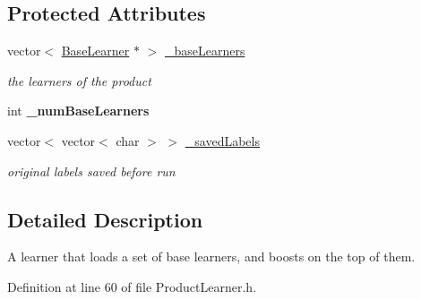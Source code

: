 \subsection*{Protected Attributes}
\begin{DoxyCompactItemize}
\item 
\hypertarget{classMultiBoost_1_1ProductLearner_a8e082a80e0c4a0c374ef6ace729aef57}{
vector$<$ \hyperlink{classMultiBoost_1_1BaseLearner}{BaseLearner} $\ast$ $>$ \hyperlink{classMultiBoost_1_1ProductLearner_a8e082a80e0c4a0c374ef6ace729aef57}{\_\-baseLearners}}
\label{classMultiBoost_1_1ProductLearner_a8e082a80e0c4a0c374ef6ace729aef57}

\begin{DoxyCompactList}\small\item\em the learners of the product \end{DoxyCompactList}\item 
\hypertarget{classMultiBoost_1_1ProductLearner_a96ab7bccfd4581e1928a630255e10124}{
int {\bfseries \_\-numBaseLearners}}
\label{classMultiBoost_1_1ProductLearner_a96ab7bccfd4581e1928a630255e10124}

\item 
\hypertarget{classMultiBoost_1_1ProductLearner_a27a48e44904e8aac9e7fcd5cde960743}{
vector$<$ vector$<$ char $>$ $>$ \hyperlink{classMultiBoost_1_1ProductLearner_a27a48e44904e8aac9e7fcd5cde960743}{\_\-savedLabels}}
\label{classMultiBoost_1_1ProductLearner_a27a48e44904e8aac9e7fcd5cde960743}

\begin{DoxyCompactList}\small\item\em original labels saved before run \end{DoxyCompactList}\end{DoxyCompactItemize}


\subsection{Detailed Description}
A learner that loads a set of base learners, and boosts on the top of them. 

Definition at line 60 of file ProductLearner.h.



